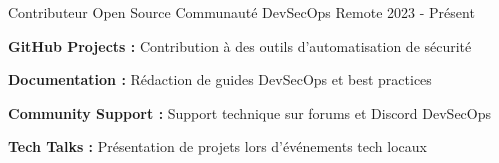 \begin{cventries}
    \cventry
    {Contributeur Open Source} %
    {Communauté DevSecOps} %
    {Remote} %
    {2023 - Présent} %
    {
        \begin{cvitems} %
            \item {\textbf{GitHub Projects :} Contribution à des outils d'automatisation de sécurité}
            \item {\textbf{Documentation :} Rédaction de guides DevSecOps et best practices}
            \item {\textbf{Community Support :} Support technique sur forums et Discord DevSecOps}
            \item {\textbf{Tech Talks :} Présentation de projets lors d'événements tech locaux}
        \end{cvitems}
    }

\end{cventries}
